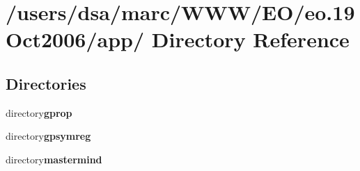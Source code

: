 \section{/users/dsa/marc/WWW/EO/eo.19Oct2006/app/ Directory Reference}
\label{dir_000020}
\subsection*{Directories}
\begin{CompactItemize}
\item 
directory{\bf gprop}
\item 
directory{\bf gpsymreg}
\item 
directory{\bf mastermind}
\end{CompactItemize}
